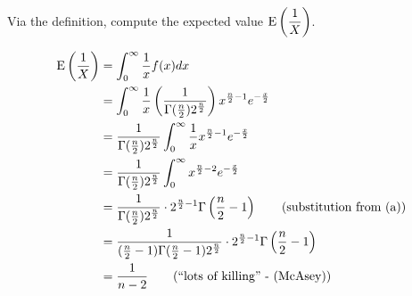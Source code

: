 Via the definition, compute the expected value $\displaystyle \E{\over{X}}$.

\soln*
\begin{align*}
    \E{\over{X}} &= \int_0^{\infty} \over{x} f(x) dx \\
    &= \int_0^{\infty} \over{x}
        \pars{\over{\Gamma(\frac{n}{2}) 2^{\frac{n}{2}}}} x^{\frac{n}{2} - 1} e^{- \frac{x}{2}
    }
\\
    &=\over{\Gamma(\frac{n}{2}) 2^{\frac{n}{2}}} \int_0^{\infty} \over{x}
    x^{\frac{n}{2} - 1} e^{- \frac{x}{2}
}\\
&=\over{\Gamma(\frac{n}{2}) 2^{\frac{n}{2}}} \int_0^{\infty} 
x^{\frac{n}{2} - 2} e^{- \frac{x}{2}}\\
&=\over{\Gamma(\frac{n}{2}) 2^{\frac{n}{2}}}  \cdot  2^{\frac{n}{2}-1} \Gamma \pars{\frac{n}{2} - 1} \tag{substitution from (a)}\\
&= \over{(\frac{n}{2} - 1) \Gamma(\frac{n}{2} - 1) 2^{\frac{n}{2}}}  \cdot  2^{\frac{n}{2}-1} \Gamma \pars{\frac{n}{2} - 1}
\\ &= \over{n-2} \tag{\say{lots of killing} - (McAsey)}\\
\end{align*}